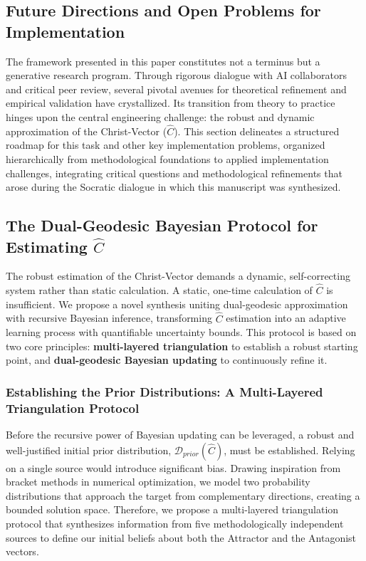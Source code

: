 \documentclass[11pt,a4paper]{article}
\theoremstyle{definition}
\theoremstyle{remark}
\begin{document}
\begin{small}

\subsection{Future Directions and Open Problems for Implementation}

The framework presented in this paper constitutes not a terminus but a generative research program. Through rigorous dialogue with AI collaborators and critical peer review, several pivotal avenues for theoretical refinement and empirical validation have crystallized. Its transition from theory to practice hinges upon the central engineering challenge: the robust and dynamic approximation of the Christ-Vector (\(\hat{C}\)). This section delineates a structured roadmap for this task and other key implementation problems, organized hierarchically from methodological foundations to applied implementation challenges, integrating critical questions and methodological refinements that arose during the Socratic dialogue in which this manuscript was synthesized.

\subsection{The Dual-Geodesic Bayesian Protocol for Estimating \(\hat{C}\)}

The robust estimation of the Christ-Vector demands a dynamic, self-correcting system rather than static calculation. A static, one-time calculation of \(\hat{C}\) is insufficient. We propose a novel synthesis uniting dual-geodesic approximation with recursive Bayesian inference, transforming \(\hat{C}\) estimation into an adaptive learning process with quantifiable uncertainty bounds. This protocol is based on two core principles: \textbf{multi-layered triangulation} to establish a robust starting point, and \textbf{dual-geodesic Bayesian updating} to continuously refine it.

\subsubsection{Establishing the Prior Distributions: A Multi-Layered Triangulation Protocol}

Before the recursive power of Bayesian updating can be leveraged, a robust and well-justified initial prior distribution, \( \mathcal{D}_{prior}(\hat{C}) \), must be established. Relying on a single source would introduce significant bias. Drawing inspiration from bracket methods in numerical optimization, we model two probability distributions that approach the target from complementary directions, creating a bounded solution space. Therefore, we propose a multi-layered triangulation protocol that synthesizes information from five methodologically independent sources to define our initial beliefs about both the Attractor and the Antagonist vectors.


\end{small}
\end{document}
